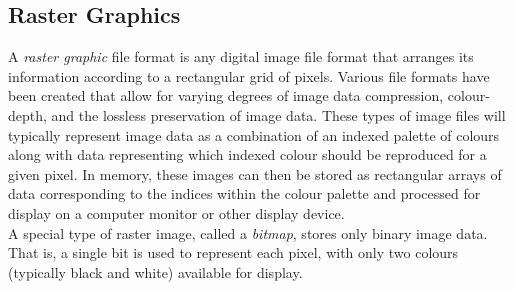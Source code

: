     \subsection{Raster Graphics}
      A \emph{raster graphic} file format is any digital image file format that arranges its information according to a rectangular grid of pixels. Various file formats have been created that allow for varying degrees of image data compression, colour-depth, and the lossless preservation of image data. These types of image files will typically represent image data as a combination of an indexed palette of colours along with data representing which indexed colour should be reproduced for a given pixel. In memory, these images can then be stored as rectangular arrays of data corresponding to the indices within the colour palette and processed for display on a computer monitor or other display device.\\[\baselineskip]
      A special type of raster image, called a \emph{bitmap}, stores only binary image data. That is, a single bit is used to represent each pixel, with only two colours (typically black and white) available for display.
